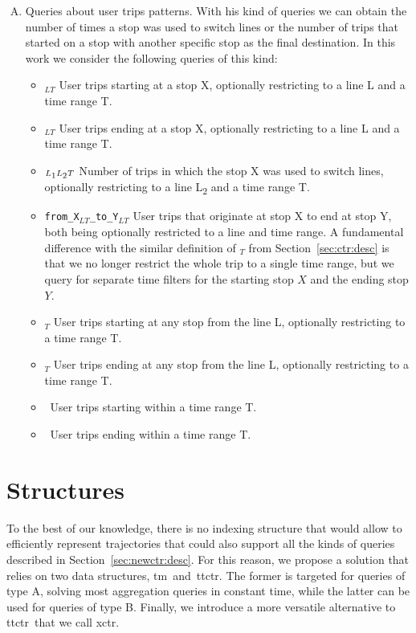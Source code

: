 \begin{enumerate}[A)]
        \item Queries about user trips patterns. With his kind of queries we can obtain the number of times a stop was used to switch lines or the number of trips that started on a stop with another specific stop as the final destination. In this work we consider the following queries of this kind:
        \begin{itemize}
            \item \startX$_{LT}$ User trips starting at a stop X, optionally restricting to a line L and a time range T.
            \item \endX$_{LT}$ User trips ending at a stop X, optionally restricting to a line L and a time range T.
            \item \switchX$_{L\textsubscript{1}L\textsubscript{2}T}$ Number of trips in which the stop X was used to switch lines, optionally restricting to a line L\textsubscript{2} and a time range T.
            \item \texttt{from\_X$_{LT}$\_to\_Y$_{LT}$} User trips that originate at stop X to end at stop Y, both being optionally restricted to a line and time range. A fundamental difference with the similar definition of \XtoY$_T$ from Section~\ref{sec:ctr:desc} is that we no longer restrict the whole trip to a single time range, but we query for separate time filters for the starting stop $X$ and the ending stop $Y$.
            \item \startL$_T$ User trips starting at any stop from the line L, optionally restricting to a time range T.
            \item \endL$_T$ User trips ending at any stop from the line L, optionally restricting to a time range T.
            \item \startT~User trips starting within a time range T.
            \item \endT~User trips ending within a time range T.
        \end{itemize}
    \end{enumerate}
	
\section{Structures}
\label{sec:newctr:str}
    To the best of our knowledge, there is no indexing structure that would allow to efficiently represent trajectories that could also support all the kinds of queries described in Section~\ref{sec:newctr:desc}. For this reason, we propose a solution that relies on two data structures, \gls{tm}~and~\gls{ttctr}. The former is targeted for queries of type A, solving most aggregation queries in constant time, while the latter can be used for queries of type B. Finally, we introduce a more versatile alternative to \gls{ttctr}~that we call \gls{xctr}.
    
